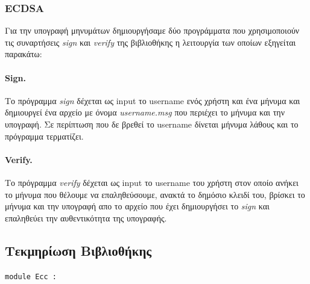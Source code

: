 \documentclass[12pt]{article}
\begin{document}
\subsubsection{ECDSA}
Για την υπογραφή μηνυμάτων δημιουργήσαμε δύο προγράμματα που χρησιμοποιούν τις συναρτήσεις \emph{sign} και \emph{verify} της βιβλιοθήκης η λειτουργία των οποίων εξηγείται παρακάτω:
\paragraph{Sign.} Το πρόγραμμα \emph{sign} δέχεται ως input το username ενός χρήστη και ένα μήνυμα και δημιουργεί ένα αρχείο με όνομα \emph{username.msg} που περιέχει το μήνυμα και την υπογραφή. Σε περίπτωση που δε βρεθεί το username δίνεται μήνυμα λάθους και το πρόγραμμα τερματίζει.
\paragraph{Verify.} Το πρόγραμμα \emph{verify} δέχεται ως input το username του χρήστη στον οποίο ανήκει το μήνυμα που θέλουμε να επαληθεύσουμε, ανακτά το δημόσιο κλειδί του, βρίσκει το μήνυμα και την υπογραφή απο το αρχείο που έχει δημιουργήσει το \emph{sign} και επαληθεύει την αυθεντικότητα της υπογραφής.

\subsection{Τεκμηρίωση Βιβλιοθήκης}

\begin{ocamldoccode}
{\tt{module }}{\tt{Ecc}}{\tt{ : }}\end{ocamldoccode}
\label{module:Ecc.Ecc}
\end{document}
